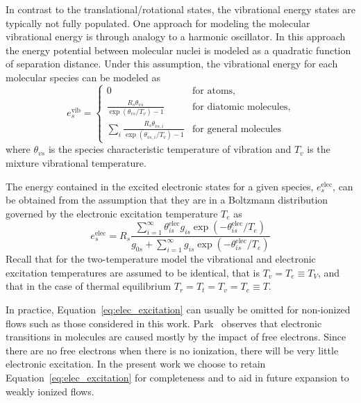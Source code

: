 In contrast to the translational/rotational states, the vibrational energy states are typically not fully populated. One approach for modeling the molecular vibrational energy is through analogy to a harmonic oscillator.  In this approach the energy potential between molecular nuclei is modeled as a quadratic function of separation distance.  Under this assumption, the vibrational energy for each molecular species can be modeled as
\begin{equation}
  \label{eq:species_vibrational_energy}
  e^{\text{vib}}_s = 
  \begin{cases}    
    0 & \text{for atoms}, \\
    \frac{R_s\theta_{vs}}{\exp\left(\theta_{vs}/T_v\right) - 1} & \text{for diatomic molecules}, \\
    \sum_i \frac{R_s\theta_{vs,i}}{\exp\left(\theta_{vs,i}/T_v\right) - 1} & \text{for general molecules}
  \end{cases}
\end{equation}
where $\theta_{vs}$ is the species characteristic temperature of vibration and $T_v$ is the mixture vibrational temperature.

The energy contained in the excited electronic states for a given species, $e^{\text{elec}}_s$, can be obtained from the assumption that they are in a Boltzmann distribution governed by the electronic excitation temperature $T_e$ as~\cite{candler_thesis}
\begin{equation}
  \label{eq:elec_excitation}
  e^{\text{elec}}_s = R_s \frac{\sum_{i=1}^\infty \theta^{\text{elec}}_{is} g_{is} \exp\left(-\theta^{\text{elec}}_{is}/T_e\right)}{g_{0s} + \sum_{i=1}^\infty g_{is} \exp\left(-\theta^{\text{elec}}_{is}/T_e\right)}
\end{equation}
Recall that for the two-temperature model the vibrational and electronic excitation temperatures are assumed to be identical, that is $T_v=T_e\equiv T_V$, and that in the case of thermal equilibrium $T_r=T_t=T_v=T_e\equiv T$.

In practice, Equation~\eqref{eq:elec_excitation} can usually be omitted for non-ionized flows such as those considered in this work. Park~\cite{park_book} observes that electronic transitions in molecules are caused mostly by the impact of free electrons.  Since there are no free electrons when there is no ionization, there will be very little electronic excitation.  In the present work we choose to retain Equation~\eqref{eq:elec_excitation} for completeness and to aid in future expansion to weakly ionized flows.


